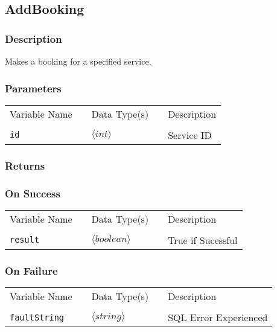 \subsection{AddBooking}

\subsubsection{Description}

Makes a booking for a specified service.

\subsubsection{Parameters}

\begin{tabular}{lllll}
Variable Name	&		&	Data Type(s)		&	&	Description	\\
				&	&	&	&	\\
\verb!id! & \hspace{15mm} & $\langle int\rangle $ & \hspace{15mm} & Service ID \\
\end{tabular}

\subsubsection{Returns}

\subsubsection{On Success}

\begin{tabular}{lllll}
Variable Name	&		&	Data Type(s)		&	&	Description	\\
				&	&	&	&	\\
\verb!result! & \hspace{15mm} & $\langle boolean\rangle $ & \hspace{15mm} & True if Sucessful \\
\end{tabular}

\subsubsection{On Failure}

\begin{tabular}{lllll}
Variable Name	&		&	Data Type(s)		&	&	Description	\\
				&	&	&	&	\\
\verb!faultString! & \hspace{15mm} & $\langle string\rangle $ & \hspace{15mm} & SQL Error Experienced \\
\end{tabular}


